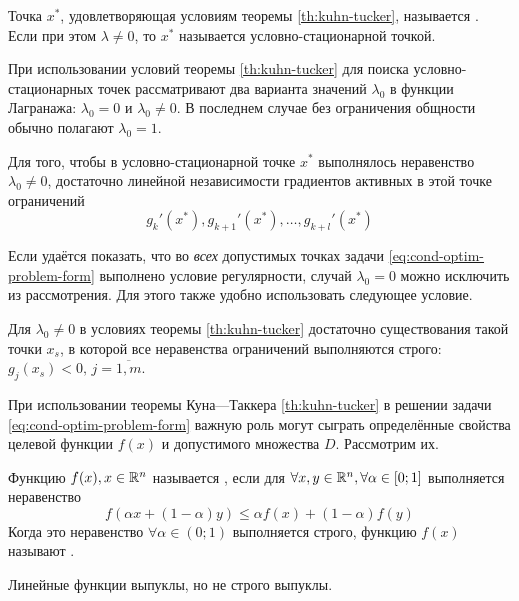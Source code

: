 \begin{dfn}
  Точка $x^*$, удовлетворяющая условиям теоремы \ref{th:kuhn-tucker},
  называется . Если при этом $\lambda ≠
  0$, то $x^*$ называется  условно-стационарной
  точкой.
\end{dfn}

При использовании условий теоремы \ref{th:kuhn-tucker} для поиска
условно-стационарных точек рассматривают два варианта значений
$\lambda_0$ в функции Лагранажа: $\lambda_0=0$ и $\lambda_0 \neq 0$. В
последнем случае без ограничения общности обычно полагают $\lambda_0 =
1$.

\begin{thm}
  \label{th:regular}
  Для того, чтобы в условно-стационарной точке $x^*$ выполнялось
  неравенство $\lambda_0 \neq 0$, достаточно линейной независимости
  градиентов активных в этой точке ограничений
  \begin{equation*}
    g_k'(x^*), g_{k+1}'(x^*), \dotsc, g_{k+l}'(x^*)
  \end{equation*}
\end{thm}

Если удаётся показать, что во \emph{всех} допустимых точках задачи
\eqref{eq:cond-optim-problem-form} выполнено условие регулярности,
случай $\lambda_0=0$ можно исключить из рассмотрения. Для этого также
удобно использовать следующее условие.

\begin{thm}
  \label{th:slater}
  Для $\lambda_0 \neq 0$ в условиях теоремы \ref{th:kuhn-tucker}
  достаточно существования такой точки $x_s$, в которой все
  неравенства ограничений выполняются строго: $g_j(x_s)<0, \,
  j=\overline{1,m}$.
\end{thm}

При использовании теоремы Куна—Таккера \ref{th:kuhn-tucker} в решении
задачи \eqref{eq:cond-optim-problem-form} важную роль могут сыграть
определённые свойства целевой функции $f(x)$ и допустимого множества
$D$. Рассмотрим их.

\begin{dfn}
  \label{dfn:convex-f}
  Функцию $f(x), x \in \mathbb{R}^n$ называется , если
  для $\forall x, y \in \mathbb{R}^n, \forall \alpha \in [0;1]$
  выполняется неравенство
  \begin{equation*}
    f(\alpha x + (1-\alpha)y) \leq \alpha f(x) + (1-\alpha) f(y)
  \end{equation*}
  Когда это неравенство $\forall \alpha \in (0;1)$ выполняется строго,
  функцию $f(x)$ называют .
\end{dfn}
\begin{rem}
  \label{rem:lin-f-convex}
  Линейные функции выпуклы, но не строго выпуклы.
\end{rem}

